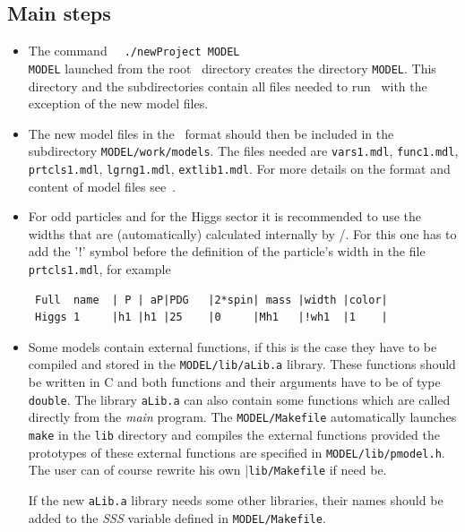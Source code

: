 \documentclass[12pt,a4paper]{article}
\begin{document}
\subsection{Main steps}
\begin{itemize}
\item
The command
\verb|  ./newProject |{\tt MODEL}\\{\tt MODEL}
launched from the root \micro\ directory  creates the directory 
\verb|MODEL|. This directory and the subdirectories contain all files needed to run \micro\ with the
exception of the new model files. 

\item
The new model files in the \calchep\ format should then be included in the
 subdirectory {\tt MODEL}\verb|/work/models|.  The files needed are
\verb|vars1.mdl|,  \verb|func1.mdl|,  \verb|prtcls1.mdl|, \verb|lgrng1.mdl|,
\verb|extlib1.mdl|. For more details on the format and content of model files see~\cite{Pukhov:2004ca}.

\item
For odd particles and for the Higgs sector it is recommended to use the widths that are (automatically) calculated internally by 
\calchep/\micro. 
For this  one has to add the '!' symbol before  
the definition of the particle's width  in  the file \verb|prtcls1.mdl|, for example
\begin{verbatim}
 Full  name  | P | aP|PDG   |2*spin| mass |width |color|  
 Higgs 1     |h1 |h1 |25    |0     |Mh1   |!wh1  |1    |
\end{verbatim}


\item
Some models contain  external functions, if this is the case  they have to be 
compiled and stored in the {\tt MODEL}\verb|/lib/aLib.a| library. 
These functions should be written in C and both functions and their arguments have to be 
of type \verb|double|. The library \verb|aLib.a| 
can also contain some functions which are called directly from the 
{\it main} program. The {\tt MODEL}\verb|/Makefile| automatically launches
\verb|make| in the \verb|lib| directory and compiles the external functions provided
the prototypes of these external 
functions are specified in  {\tt MODEL}\verb|/lib/pmodel.h|. 
The user can of course rewrite 
his own  |\verb|lib/Makefile| if need be.

If the new \verb|aLib.a| library needs some other libraries, their
names should be added to the {\it SSS} variable defined in {\tt MODEL}\verb|/Makefile|.
\end{itemize}
\end{document}
